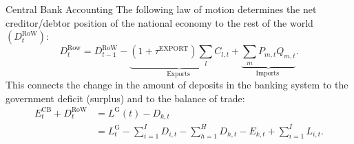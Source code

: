 \documentclass[9pt]{beamer}
\begin{document}
\begin{frame}{Central Bank Accounting}
    The following law of motion determines the net creditor/debtor position of the national economy to the rest of the world $\left(D^{\mathrm{RoW}}_t\right)$:
\begin{equation}
    D^{\mathrm{Row}}_t=D^{\mathrm{RoW}}_{t-1}-\underbrace{\left(1+\tau^{\mathrm{EXPORT}}\right) \sum_l C_{l,t}}_{\text {Exports }}+\underbrace{\sum_m P_{m,t} Q_{m,t}}_{\text {Imports }} .
\end{equation}
This connects the change in the amount of deposits in the banking system to the government deficit (surplus)  and to the balance of trade: 
\begin{equation}
    \begin{aligned}
E^{\mathrm{CB}}_t+D^{\mathrm{RoW}}_t & =L^{\mathrm{G}}(t)-D_{k,t} \\
& =L^{\mathrm{G}}_t-\sum_{i=1}^I D_{i,t}-\sum_{h=1}^H D_{h,t}-E_{k,t}+\sum_{i=1}^I L_{i,t} .
\end{aligned}
\end{equation}
\hyperlink{ReturnOverview}{}
\end{frame}
\end{document}
